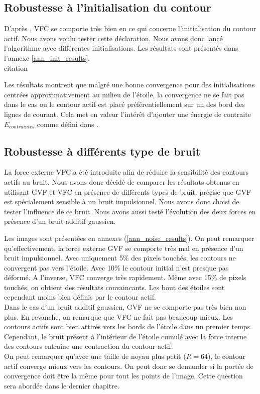 \subsection{Robustesse à l'initialisation du contour}
D'après \cite{vfc}, VFC se comporte très bien en ce qui concerne l'initialisation du contour actif. Nous avons voulu tester cette déclaration. Nous avons donc lancé l'algorithme avec différentes initialisations. Les résultats sont présentés dans l'annexe \ref{ann_init_results}.\\ citation

Les résultats montrent que malgré une bonne convergence pour des initialisations centrées approximativement au milieu de l'étoile, la convergence ne se fait pas dans le cas ou le contour actif est placé préférentiellement sur un des bord des lignes de courant. Cela met en valeur l'intérêt d'ajouter une énergie de contraite $E_{contraintes}$ comme défini dans \cite{kaas}. 


\subsection{Robustesse à différents type de bruit}
La force externe VFC a été introduite afin de réduire la sensibilité des contours actifs au bruit. Nous avons donc décidé de comparer les résultats obtenus en utilisant GVF et VFC en présence de différents types de bruit. \cite{vfc} précise que GVF est spécialement sensible à un bruit impulsionnel. Nous avons donc choisi de tester l'influence de ce bruit. Nous avons aussi testé l'évolution des deux forces en présence d'un bruit additif gaussien. 

Les images sont présentées en annexes (\ref{ann_noise_results}). On peut remarquer qu'effectivement, la force externe GVF se comporte très mal en présence d'un bruit impulsionnel. Avec uniquement 5\% des pixels touchés, les contours ne convergent pas vers l'étoile. Avec 10\% le contour initial n'est presque pas déformé. A l'inverse, VFC converge très rapidement. Même avec 15\% de pixels touchés, on obtient des résultats convaincants. Les bout des étoiles sont cependant moins bien définis par le contour actif.\\

Dans le cas d'un bruit additif gaussien, GVF ne se comporte pas très bien non plus. En revanche, on remarque que VFC ne fait pas beaucoup mieux. Les contours actifs sont bien attirés vers les bords de l'étoile dans un premier temps. Cependant, le bruit présent à l'intérieur de l'étoile cumulé avec la force interne des contours entraîne une contraction du contour actif.\\

On peut remarquer qu'avec une taille de noyau plus petit ($R = 64$), le contour actif converge mieux vers les contours. On peut donc se demander si la portée de convergence doit être la même pour tout les points de l'image. Cette question sera abordée dans le dernier chapitre.
